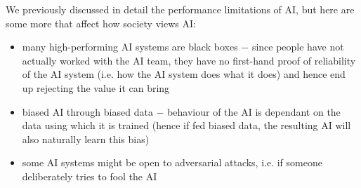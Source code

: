 \documentclass{article}[a4paper,12pt]
\theoremstyle{definition}
\begin{document}
We previously discussed in detail the performance limitations of AI, but here are some more that affect how society views AI:
\begin{itemize}
	\item many high-performing AI systems are black boxes $-$ since people have not actually worked with the AI team, they have no first-hand proof of reliability of the AI system (i.e. how the AI system does what it does) and hence end up rejecting the value it can bring
	\item biased AI through biased data $-$ behaviour of the AI is dependant on the data using which it is trained (hence if fed biased data, the resulting AI will also naturally learn this bias)
	\item some AI systems might be open to adversarial attacks, i.e. if someone deliberately tries to fool the AI
\end{itemize}
\end{document}
